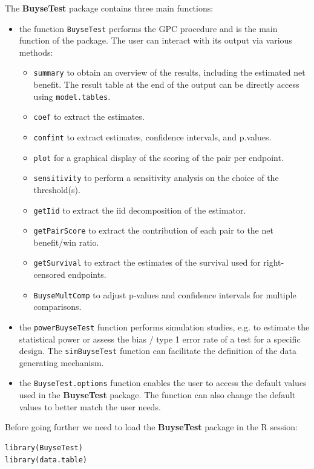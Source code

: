 \documentclass[12pt]{article}
\begin{document}
The \textbf{BuyseTest} package contains three main functions:
\begin{itemize}
\item the function \texttt{BuyseTest} performs the GPC procedure and is the main
function of the package. The user can interact with its output via
various methods:
\begin{itemize}
\item \texttt{summary} to obtain an overview of the results, including the
estimated net benefit. The result table at the end of the output
can be directly access using \texttt{model.tables}.
\item \texttt{coef} to extract the estimates.
\item \texttt{confint} to extract estimates, confidence intervals, and p.values.
\item \texttt{plot} for a graphical display of the scoring of the pair per endpoint.
\item \texttt{sensitivity} to perform a sensitivity analysis on the choice of the threshold(s).
\item \texttt{getIid} to extract the iid decomposition of the estimator.
\item \texttt{getPairScore} to extract the contribution of each pair to the net benefit/win ratio.
\item \texttt{getSurvival} to extract the estimates of the survival used for right-censored endpoints.
\item \texttt{BuyseMultComp} to adjust p-values and confidence intervals for multiple comparisons.
\end{itemize}
\item the \texttt{powerBuyseTest} function performs simulation studies, e.g. to
estimate the statistical power or assess the bias / type 1 error
rate of a test for a specific design. The \texttt{simBuyseTest} function
can facilitate the definition of the data generating mechanism.
\item the \texttt{BuyseTest.options} function enables the user to access the
default values used in the \textbf{BuyseTest} package. The function can
also change the default values to better match the user needs.
\end{itemize}

\clearpage

Before going further we need to load the \textbf{BuyseTest} package in the R
session:
\lstset{language=r,label= ,caption= ,captionpos=b,numbers=none}
\begin{lstlisting}
library(BuyseTest)
library(data.table)
\end{lstlisting}
\end{document}
